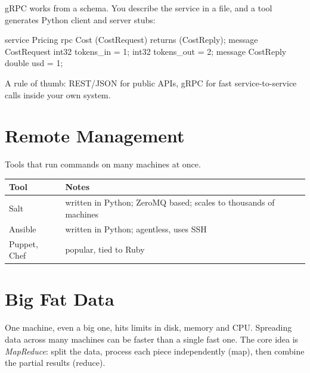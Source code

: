 gRPC works from a schema. You describe the service in a  file, and a tool
generates Python client and server stubs:

\begin{rawcode}
service Pricing {
  rpc Cost (CostRequest) returns (CostReply);
}
message CostRequest { int32 tokens_in = 1; int32 tokens_out = 2; }
message CostReply   { double usd = 1; }
\end{rawcode}

A rule of thumb: REST/JSON for public APIs, gRPC for fast service-to-service calls
inside your own system.

\section{Remote Management}

Tools that run commands on many machines at once.

\begin{center}
\begin{tabularx}{\linewidth}{@{}l X@{}}
\toprule
\textbf{Tool} & \textbf{Notes} \\
\midrule
Salt & written in Python; ZeroMQ based; scales to thousands of machines \\
Ansible & written in Python; agentless, uses SSH \\
Puppet, Chef & popular, tied to Ruby \\
\bottomrule
\end{tabularx}
\end{center}

\section{Big Fat Data}

One machine, even a big one, hits limits in disk, memory and CPU. Spreading data across
many machines can be faster than a single fast one. The core idea is \emph{MapReduce}:
split the data, process each piece independently (map), then combine the partial results
(reduce).

